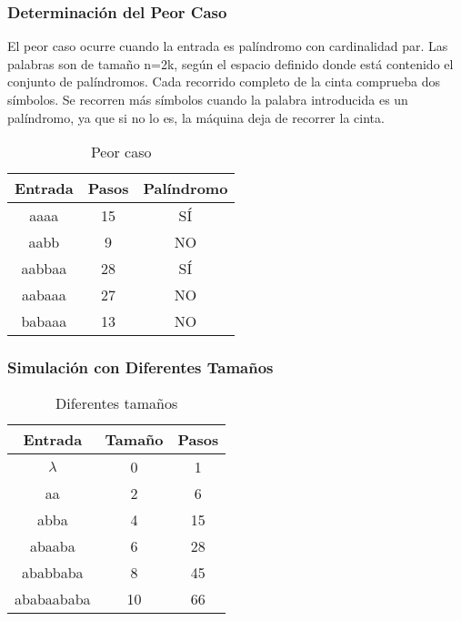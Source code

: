 \documentclass{uc3mpracticas}
\begin{document}
  \subsubsection{Determinación del Peor Caso}

  El peor caso ocurre cuando la entrada es palíndromo con cardinalidad par. Las palabras son de tamaño n=2k, según el espacio definido donde está contenido el conjunto de palíndromos. Cada recorrido completo de la cinta comprueba dos símbolos. Se recorren más símbolos cuando la palabra introducida es un palíndromo, ya que si no lo es, la máquina deja de recorrer la cinta.

  \begin{table}[!h]
    \centering
  \begin{tabular}{|c|c|c|}
  \hline
  \textbf{Entrada} & \textbf{Pasos} & \textbf{Palíndromo} \\ \hline
  aaaa             & 15             & SÍ                  \\ \hline
  aabb             & 9              & NO                  \\ \hline
  aabbaa           & 28             & SÍ                  \\ \hline
  aabaaa           & 27             & NO                  \\ \hline
  babaaa           & 13             & NO                  \\ \hline
  \end{tabular}
  \caption{Peor caso}
  \end{table}



  \subsubsection{Simulación con Diferentes Tamaños}

    \begin{table}[!h]
      \centering
    \begin{tabular}{|c|c|c|}
    \hline
    \textbf{Entrada} & \textbf{Tamaño} & \textbf{Pasos} \\ \hline
    $\lambda$           & 0               & 1              \\ \hline
    aa               & 2               & 6              \\ \hline
    abba             & 4               & 15             \\ \hline
    abaaba           & 6               & 28             \\ \hline
    ababbaba         & 8               & 45             \\ \hline
    ababaababa       & 10              & 66             \\ \hline
    \end{tabular}
    \caption{Diferentes tamaños}
    \end{table}
\end{document}
